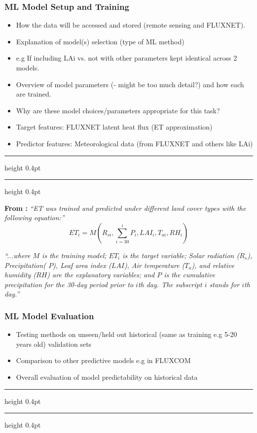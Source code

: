 \documentclass[paper=a4, fontsize=12pt]{scrartcl}
\newcommand{\notedivider}{%
	\vspace{4pt}%
	{\hrule height 0.4pt}%
	\vspace{6pt}%
	{\hrule height 0.4pt}
	\vspace{6pt}
}
\begin{document}
	\subsubsection{ML Model Setup and Training}
	\begin{itemize}
		\item How the data will be accessed and stored (remote sensing and FLUXNET).
		\item Explanation of model(s) selection (type of ML method)
		\item e.g If including LAi vs. not with other parameters kept identical across 2 models.
		\item Overview of model parameters (- might be too much detail?) and how each are trained.
		\item Why are these model choices/parameters appropriate for this task?
		\item Target features: FLUXNET latent heat flux (ET approximation)
		\item Predictor features: Meteorological data (from FLUXNET and others like LAi)
	\end{itemize}
	\notedivider
	
	\textbf{From \citep{xu2018evaluating}:} \textit{``ET was trained and predicted under different land cover types with the following equation:''}
	\begin{equation}
		ET_i = M\left(R_{si},\sum_{i=30}^{i}P_{i},LAI_{i},T_{ai},RH_{i}\right)
	\end{equation}
	
	\textit{``...where $M$ is the training model; $ET_i$ is the target variable; Solar radiation ($R_s$), Precipitation( $P$), Leaf area index ($LAI$), Air temperature ($T_a$), and relative humidity ($RH$) are the explanatory variables; and $P$ is the cumulative precipitation for the 30-day period prior to $i$th day. The subscript $i$ stands for $i$th day.''}
	
	\newpage
	\subsubsection{ML Model Evaluation}
	\begin{itemize}
		\item Testing methods on unseen/held out historical (same as training e.g 5-20 years old) validation sets
		\item Comparison to other predictive models e.g in FLUXCOM
		\item Overall evaluation of model predictability on historical data
	\end{itemize}
	\notedivider
	
\end{document}
